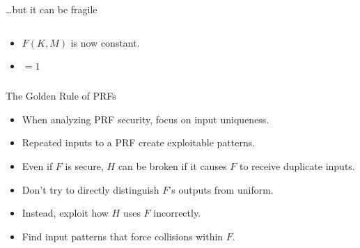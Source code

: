 \documentclass[aspectratio=169, lualatex, handout]{beamer}
\begin{document}
\begin{frame}{\ldots but it can be fragile}
	\begin{columns}[c]
		\begin{column}{0.5\textwidth}
			\begin{itemize}
				\item $F(K, M)$ is now constant.
				\item {} $ = 1$
			\end{itemize}
		\end{column}
		\begin{column}{0.5\textwidth}
		\end{column}
	\end{columns}
\end{frame}

\begin{frame}{The Golden Rule of PRFs}
	\begin{itemize}
		\item When analyzing PRF security, focus on input uniqueness.
		\item Repeated inputs to a PRF create exploitable patterns.
		\item Even if $F$ is secure, $H$ can be broken if it causes $F$ to receive duplicate inputs.
		\item Don't try to directly distinguish $F$'s outputs from uniform.
		\item Instead, exploit how $H$ uses $F$ incorrectly.
		\item Find input patterns that force collisions within $F$.
	\end{itemize}
\end{frame}
\end{document}
